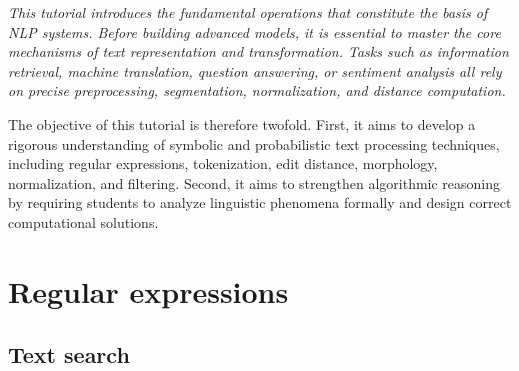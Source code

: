 \documentclass{../extra/aakpract/aakpract}
\begin{document}
	
	\maketitle
	
	\begin{center}
		\begin{minipage}{0.85\textwidth}
			\small\itshape
			This tutorial introduces the fundamental operations that constitute the basis of NLP systems. 
			Before building advanced models, it is essential to master the core mechanisms of text representation and transformation. 
			Tasks such as information retrieval, machine translation, question answering, or sentiment analysis all rely on precise preprocessing, segmentation, normalization, and distance computation.
			
			\vspace{6pt}
			The objective of this tutorial is therefore twofold. 
			First, it aims to develop a rigorous understanding of symbolic and probabilistic text processing techniques, including regular expressions, tokenization, edit distance, morphology, normalization, and filtering. 
			Second, it aims to strengthen algorithmic reasoning by requiring students to analyze linguistic phenomena formally and design correct computational solutions.
	
		\end{minipage}
	\end{center}
	
	\section{Regular expressions}
	
	\subsection{Text search}
	
\end{document}
